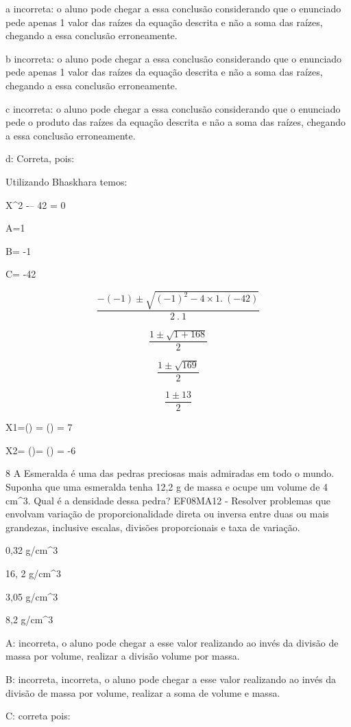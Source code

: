 a incorreta: o aluno pode chegar a essa conclusão considerando que o
enunciado pede apenas 1 valor das raízes da equação descrita e não a
soma das raízes, chegando a essa conclusão erroneamente.

b incorreta: o aluno pode chegar a essa conclusão considerando que o
enunciado pede apenas 1 valor das raízes da equação descrita e não a
soma das raízes, chegando a essa conclusão erroneamente.

c incorreta: o aluno pode chegar a essa conclusão considerando que o
enunciado pede o produto das raízes da equação descrita e não a soma das
raízes, chegando a essa conclusão erroneamente.

d: Correta, pois:

Utilizando Bhaskhara temos:

X^2 -\times -- 42 = 0

A=1

B= -1

C= -42

\[\frac{- ( - 1) \pm \sqrt{{( - 1)}^{2} - 4\times 1.\ ( - 42)}}{2\ .\ 1}\]

\[\frac{1 \pm \sqrt{1 + 168}}{2}\]

\[\frac{1 \pm \sqrt{169}}{2}\]

\[\frac{1 \pm 13}{2}\]

X1=() = () = 7

X2= ()= () = -6

\num{8} A Esmeralda é uma das pedras preciosas mais admiradas em todo o
mundo. Suponha que uma esmeralda tenha 12,2 g de massa e ocupe um volume
de 4 cm^3. Qual é a densidade dessa pedra? EF08MA12 - Resolver problemas
que envolvam variação de proporcionalidade direta ou inversa entre duas
ou mais grandezas, inclusive escalas, divisões proporcionais e taxa de
variação.

\item 0,32 g/cm^3
\item 16, 2 g/cm^3
\item 3,05 g/cm^3
\item 8,2 g/cm^3

A: incorreta, o aluno pode chegar a esse valor realizando ao invés da
divisão de massa por volume, realizar a divisão volume por massa.

B: incorreta, incorreta, o aluno pode chegar a esse valor realizando ao
invés da divisão de massa por volume, realizar a soma de volume e massa.

C: correta pois:

